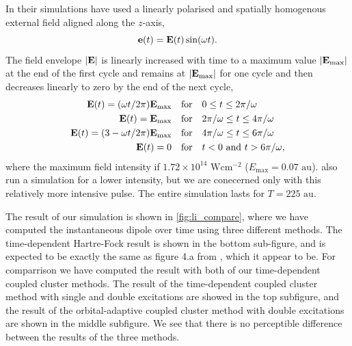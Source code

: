 In their simulations \citeauthor{li2005time} have used a linearly polarised and 
spatially homogenous external field aligned along the $z$-axis, 
\begin{equation}
    \vb{e}(t) = \vb{E}(t)\sin(\omega t).
\end{equation}
The field envelope $|\vb{E}|$ is linearly increased with time to a maximum value 
$|\vb{E}_\text{max}|$ at the end of the first cycle and remains at $|\vb{E}_\text{max}|$
for one cycle and then decreases linearly to zero by the end of the next cycle,
\begin{equation}
    \begin{aligned}
        \vb{E}(t) = (\omega t / 2\pi) \vb{E}_\text{max} \quad &\text{for} \quad
            0 \leq t \leq 2\pi / \omega \\ 
        \vb{E}(t) = \vb{E}_\text{max} \quad &\text{for} \quad 
            2\pi / \omega \leq t \leq 4\pi / \omega \\ 
        \vb{E}(t) = (3 - \omega t / 2\pi) \vb{E}_\text{max} \quad &\text{for} \quad 
            4\pi / \omega \leq t \leq 6\pi / \omega \\
        \vb{E}(t) = 0 \quad &\text{for} \quad
            t < 0 \text{ and } t > 6\pi / \omega,
    \end{aligned}
\end{equation}
where the maximum field intensity if $1.72\times10^{14} \text{ W} \text{cm}^{-2}$ 
($E_\text{max} = 0.07 \text{ au}$). \citeauthor{li2005time} also run a simulation 
for a lower intensity, but we are conecerned only with this relatively more intensive 
pulse. The entire simulation lasts for $T=225 \text{ au}$.

The result of our simulation is shown in \autoref{fig:li_compare}, where we have 
computed the instantaneous dipole over time using three different methods. The 
time-dependent Hartre-Fock result is shown in the bottom sub-figure, and is expected 
to be exactly the same as figure 4.a from \citeauthor{li2005time}\cite{li2005time},
which it appear to be. For comparrison we have computed the result with both of 
our time-dependent coupled cluster methods. The result of the time-dependent 
coupled cluster method with single and double excitations are showed in the top subfigure,
and the result of the orbital-adaptive coupled cluster method with double excitations 
are shown in the middle subfigure. We see that there is no perceptible difference between 
the results of the three methods.

